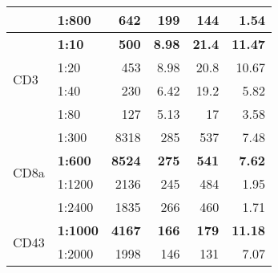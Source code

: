 \begin{sidewaystable}[!htbp]
\begin{tabular}{llrrrr}
                       & 1:800    & 642                                     & 199                                     & 144                                        & 1.54           \\
\hline
\multirow{4}{*}{CD3}   & \textbf{1:10}     & \textbf{500}                                     & \textbf{8.98}                                    & \textbf{21.4}                                       & \textbf{11.47}          \\
                       & 1:20     & 453                                     & 8.98                                    & 20.8                                       & 10.67          \\
                       & 1:40     & 230                                     & 6.42                                    & 19.2                                       & 5.82           \\
                       & 1:80     & 127                                     & 5.13                                    & 17                                         & 3.58           \\
\hline
\multirow{4}{*}{CD8a}  & 1:300    & 8318                                    & 285                                     & 537                                        & 7.48           \\
                       & \textbf{1:600}    & \textbf{8524}                                    & \textbf{275}                                     & \textbf{541}                                        & \textbf{7.62}           \\
                       & 1:1200   & 2136                                    & 245                                     & 484                                        & 1.95           \\
                       & 1:2400   & 1835                                    & 266                                     & 460                                        & 1.71           \\
\hline
\multirow{3}{*}{CD43}  & \textbf{1:1000}   & \textbf{4167}                                    & \textbf{166}                                     & \textbf{179}                                        & \textbf{11.18}          \\
                       & 1:2000   & 1998                                    & 146                                     & 131                                        & 7.07           \\

\end{tabular}
\end{sidewaystable}
